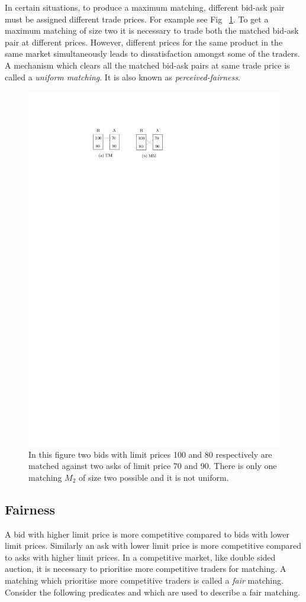 \documentclass[a4paper,UKenglish,cleveref, autoref]{lipics-v2019}
\begin{document}
In certain situations, to produce a maximum matching, different bid-ask pair must be assigned different trade prices. For example see Fig ~\ref{fig:mmum}. To get a maximum matching of size two it is necessary to trade both the matched bid-ask pair at different prices.  However, different prices for the same product in the same market simultaneously leads to dissatisfaction amongst some of the traders. A mechanism which clears all the matched bid-ask pairs at same trade price is called a \emph{uniform matching}. It is also known as \emph{perceived-fairness}. 

\begin{figure}[h!]
\centering
\includegraphics[width=.5\textwidth]{mm_um.pdf}
\caption{In this figure two bids with limit prices 100 and 80 respectively are matched against two asks of limit price 70 and 90. There is only one matching $M_2$ of size two possible and it is not uniform.}
\label{fig:mmum}
\end{figure}

\subsection{Fairness}  

A bid with higher limit price is more competitive compared to bids with lower limit prices. Similarly an ask with lower limit price is more competitive compared to asks with higher limit prices. In a competitive market, like double sided auction, it is necessary to prioritise more competitive traders for matching. A matching which prioritise more competitive traders is called a \emph{fair} matching. Consider the following predicates  and   which are used to describe a fair matching. 
\end{document}
